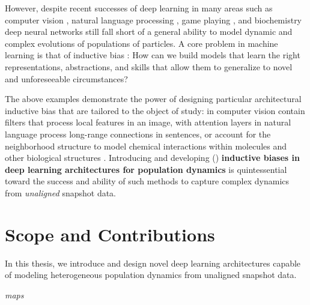 However, despite recent successes of deep learning in many areas such as computer vision \citep{lecun1998gradient, krizhevsky2012imagenet}, natural language processing \citep{bengio2000neural, vaswani2017attention}, game playing \citep{mnih2015human, silver2016mastering, kipf2018neural}, and biochemistry \citep{jumper2021highly, kipf2016semi} deep neural networks still fall short of a general ability to model dynamic and complex evolutions of populations of particles.
A core problem in machine learning is that of inductive bias \citep{mitchell1980need}: How can we build models that learn the right representations, abstractions, and skills that allow them to generalize to novel and unforeseeable circumstances?

The above examples demonstrate the power of designing particular architectural inductive bias that are tailored to the object of study:  in computer vision contain filters that process local features in an image,  with attention layers in natural language process long-range connections in sentences, or  account for the neighborhood structure to model chemical interactions within molecules and other biological structures \citep{ganea2021geomol, somnath2021multi}.
Introducing and developing () \textbf{inductive biases in deep learning architectures for population dynamics}  is quintessential toward the success and ability of such methods to capture complex dynamics from \emph{unaligned} snapshot data.

\section{Scope and Contributions}

In this thesis, we introduce and design novel deep learning architectures capable of modeling heterogeneous population dynamics from unaligned snapshot data.

\emph{maps}

